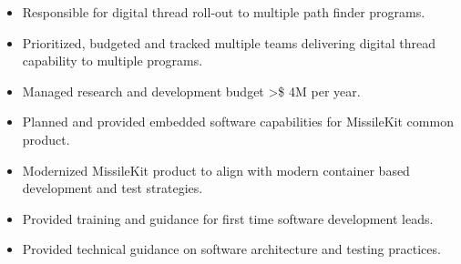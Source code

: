         \begin{itemize}
            \item Responsible for digital thread roll-out to multiple path finder programs.
            \item Prioritized, budgeted and tracked multiple teams delivering digital thread capability to multiple programs.
            \item Managed research and development budget >\$ 4M per year.
        \end{itemize}
        \begin{itemize}
            \item Planned and provided embedded software capabilities for MissileKit common product.
            \item Modernized MissileKit product to align with modern container based development and test strategies.
        \end{itemize}
        \begin{itemize}
            \item Provided training and guidance for first time software development leads.
            \item Provided technical guidance on software architecture and testing practices.
        \end{itemize}

